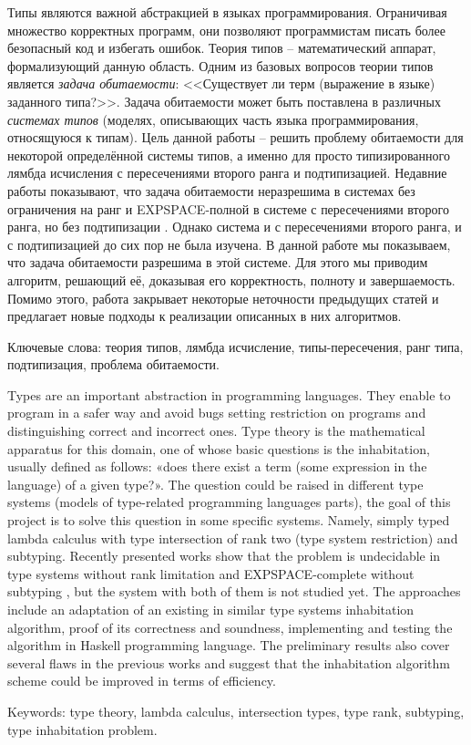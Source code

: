 \documentclass[../main.tex]{subfiles}
\begin{document}
Типы являются важной абстракцией в языках программирования. Ограничивая множество корректных программ, они позволяют программистам писать более безопасный код и избегать ошибок. Теория типов -- математический аппарат, формализующий данную область. Одним из базовых вопросов теории типов является {\it задача обитаемости}: <<Существует ли терм (выражение в языке) заданного типа?>>. Задача обитаемости может быть поставлена в различных {\it системах типов} (моделях, описывающих часть языка программирования, относящуюся к типам). Цель данной работы -- решить проблему обитаемости для некоторой определённой системы типов, а именно для просто типизированного лямбда исчисления с пересечениями второго ранга и подтипизацией. Недавние работы показывают, что задача обитаемости неразрешима в системах без ограничения на ранг \cite{urzyczyn_97} и EXPSPACE-полной в системе с пересечениями второго ранга, но без подтипизации \cite{kusmierek_07, urzyczyn_09}. Однако система и с пересечениями второго ранга, и с подтипизацией до сих пор не была изучена. В данной работе мы показываем, что задача обитаемости разрешима в этой системе. Для этого мы приводим алгоритм, решающий её, доказывая его корректность, полноту и завершаемость. Помимо этого, работа закрывает некоторые неточности предыдущих статей и предлагает новые подходы к реализации описанных в них алгоритмов.

\vspace*{\fill}

Ключевые слова: теория типов, лямбда исчисление, типы-пересечения, ранг типа, подтипизация, проблема обитаемости.


\newpage

Types are an important abstraction in programming languages. They enable to program in a safer way and avoid bugs setting restriction on programs and distinguishing correct and incorrect ones. Type theory is the mathematical apparatus for this domain, one of whose basic questions is the inhabitation, usually defined as follows: «does there exist a term (some expression in the language) of a given type?». The question could be raised in different type systems (models of type-related programming languages parts), the goal of this project is to solve this question in some specific systems. Namely, simply typed lambda calculus with type intersection of rank two (type system restriction) and subtyping. Recently presented works show that the problem is undecidable in type systems without rank limitation \cite{urzyczyn_97} and EXPSPACE-complete without subtyping \cite{kusmierek_07, urzyczyn_09}, but the system with both of them is not studied yet. The approaches include an adaptation of an existing in similar type systems inhabitation algorithm, proof of its correctness and soundness, implementing and testing the algorithm in Haskell programming language. The preliminary results also cover several flaws in the previous works and suggest that the inhabitation algorithm scheme could be improved in terms of efficiency.

\vspace*{\fill}

Keywords: type theory, lambda calculus, intersection types, type rank, subtyping, type inhabitation problem.
\end{document}

